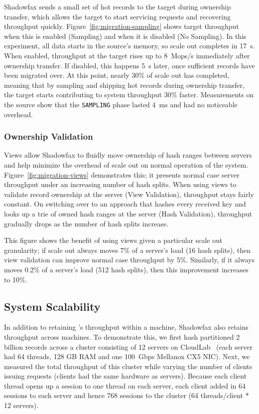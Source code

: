 Shadowfax sends a small set of hot records to the target during ownership
transfer, which allows the target to start servicing requests and recovering
throughput quickly.
%
Figure~\ref{fig:migration-sampling} shows target throughput
when this is enabled (Sampling) and when it is disabled (No
Sampling).
%
In this experiment, all data starts in the source's memory, so scale out
completes in 17~s.
%
When enabled, throughput at the target rises up to 8~Mops/s immediately
after ownership transfer.
%
If disabled, this happens 5~s later, once sufficient records have
been migrated over.
%
At this point, nearly 30\% of scale out has completed, meaning that
by sampling and shipping hot records during ownership transfer,
the target starts contributing to system throughput 30\% faster.
%
Measurements on the source show that the \texttt{SAMPLING} phase lasted
4~ms and had no noticeable overhead.

\subsubsection{Ownership Validation}
\label{sec:eval:migration:views}

Views allow Shadowfax to fluidly move ownership of hash ranges between
servers and help minimize the overhead of scale out on normal
operation of the system.
%
Figure~\ref{fig:migration-views} demonstrates this; it presents normal
case server throughput under an increasing number of hash splits.
%
When using views to validate record ownership at the
server (View Validation), throughput stays fairly constant.
%
On switching over to an approach that hashes every received key and
looks up a trie of owned hash ranges at the server (Hash Validation),
throughput gradually drops as the number of hash splits increase.

This figure shows the benefit of using views given a particular scale
out granularity; if scale out always moves 7\% of a server's load (16
hash splits), then view validation can improve normal case
throughput by 5\%.
%
Similarly, if it always moves 0.2\% of a server's load (512 hash
splits), then this improvement increases to 10\%.

\subsection{System Scalability}
\label{sec:eval:system-scalability}

%
In addition to retaining \faster's throughput within a machine,
Shadowfax also retains throughput across machines.
%
To demonstrate this, we first hash partitioned 2 billion records across a
cluster consisting of 12 servers on
CloudLab~\cite{cloudlab} (each server had 64 threads, 128 GB RAM and
one 100~Gbps Mellanox CX5 NIC).
%
Next, we measured the total throughput of this cluster while varying the
number
of clients issuing requests (clients had the same hardware as servers).
%
Because each client thread opens up a session to one thread on each server,
each client added in 64 sessions to each server and hence 768 sessions
to the cluster (64 threads/client * 12 servers).

